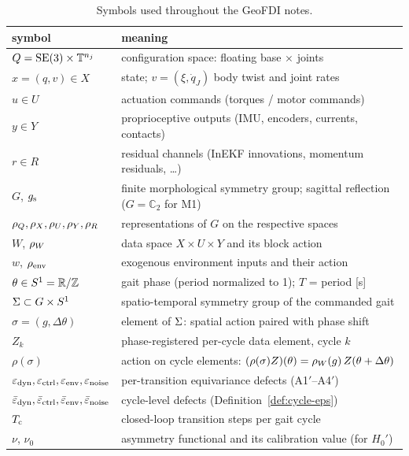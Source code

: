 \begin{table}[ht]
\centering
\small
\begin{tabular}{@{}ll@{}}
\toprule
symbol & meaning \\
\midrule
$Q = \mathrm{SE}(3)\times\mathbb{T}^{n_j}$ & configuration space: floating base $\times$ joints \\
$x = (q,v) \in X$ & state; $v = (\xi, \dot q_J)$ body twist and joint rates \\
$u \in U$ & actuation commands (torques / motor commands) \\
$y \in Y$ & proprioceptive outputs (IMU, encoders, currents, contacts) \\
$r \in R$ & residual channels (InEKF innovations, momentum residuals, \dots) \\
$G$, $g_{\mathrm{s}}$ & finite morphological symmetry group; sagittal reflection ($G=\mathbb{C}_2$ for M1) \\
$\rho_{Q},\rho_{X},\rho_{U},\rho_{Y},\rho_{R}$ & representations of $G$ on the respective spaces \\
$W$, $\rho_{W}$ & data space $X\times U\times Y$ and its block action \\
$w$, $\rho_{\mathrm{env}}$ & exogenous environment inputs and their action \\
$\theta \in S^1 = \mathbb{R}/\mathbb{Z}$ & gait phase (period normalized to 1); $T$ = period [s] \\
$\Sigma \subset G \times S^1$ & spatio-temporal symmetry group of the commanded gait \\
$\sigma = (g, \Delta\theta)$ & element of $\Sigma$: spatial action paired with phase shift \\
$Z_k$ & phase-registered per-cycle data element, cycle $k$ \\
$\rho(\sigma)$ & action on cycle elements: $(\rho(\sigma)Z)(\theta) = \rho_{W}(g)\,Z(\theta+\Delta\theta)$ \\
$\varepsilon_{\mathrm{dyn}},\varepsilon_{\mathrm{ctrl}},\varepsilon_{\mathrm{env}},\varepsilon_{\mathrm{noise}}$ & per-transition equivariance defects (A1$'$--A4$'$) \\
$\bar\varepsilon_{\mathrm{dyn}},\bar\varepsilon_{\mathrm{ctrl}},\bar\varepsilon_{\mathrm{env}},\bar\varepsilon_{\mathrm{noise}}$ & cycle-level defects (Definition~\ref{def:cycle-eps}) \\
$T_{\mathrm{c}}$ & closed-loop transition steps per gait cycle \\
$\nu$, $\nu_0$ & asymmetry functional and its calibration value (for $H_0'$) \\
\bottomrule
\end{tabular}
\caption{Symbols used throughout the GeoFDI notes.}
\label{tab:symbols}
\end{table}

